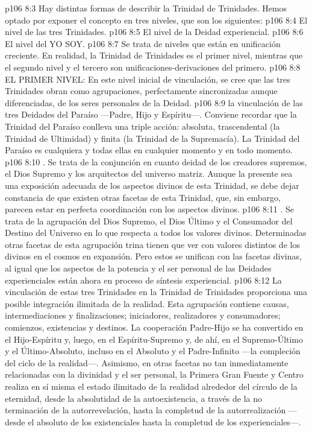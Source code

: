 \vs p106 8:3 Hay distintas formas de describir la Trinidad de Trinidades. Hemos optado por exponer el concepto en tres niveles, que son los siguientes:
\vs p106 8:4 El nivel de las tres Trinidades.
\vs p106 8:5 El nivel de la Deidad experiencial.
\vs p106 8:6 El nivel del YO SOY.
\vs p106 8:7 \pc Se trata de niveles que están en unificación creciente. En realidad, la Trinidad de Trinidades es el primer nivel, mientras que el segundo nivel y el tercero son unificaciones\hyp{}derivaciones del primero.
\vs p106 8:8 \pc EL PRIMER NIVEL: En este nivel inicial de vinculación, se cree que las tres Trinidades obran como agrupaciones, perfectamente sincronizadas aunque diferenciadas, de los seres personales de la Deidad.
\vs p106 8:9  la vinculación de las tres Deidades del Paraíso ---Padre, Hijo y Espíritu---. Conviene recordar que la Trinidad del Paraíso conlleva una triple acción: absoluta, trascendental (la Trinidad de Ultimidad) y finita (la Trinidad de la Supremacía). La Trinidad del Paraíso es cualquiera y todas ellas en cualquier momento y en todo momento.
\vs p106 8:10 . Se trata de la conjunción en cuanto deidad de los creadores supremos, el Dios Supremo y los arquitectos del universo matriz. Aunque la presente sea una exposición adecuada de los aspectos divinos de esta Trinidad, se debe dejar constancia de que existen otras facetas de esta Trinidad, que, sin embargo, parecen estar en perfecta coordinación con los aspectos divinos.
\vs p106 8:11 . Se trata de la agrupación del Dios Supremo, el Dios Último y el Consumador del Destino del Universo en lo que respecta a todos los valores divinos. Determinadas otras facetas de esta agrupación trina tienen que ver con valores distintos de los divinos en el cosmos en expansión. Pero estos se unifican con las facetas divinas, al igual que los aspectos de la potencia y el ser personal de las Deidades experienciales están ahora en proceso de síntesis experiencial.
\vs p106 8:12 \pc La vinculación de estas tres Trinidades en la Trinidad de Trinidades proporciona una posible integración ilimitada de la realidad. Esta agrupación contiene causas, intermediaciones y finalizaciones; iniciadores, realizadores y consumadores; comienzos, existencias y destinos. La cooperación Padre\hyp{}Hijo se ha convertido en el Hijo\hyp{}Espíritu y, luego, en el Espíritu\hyp{}Supremo y, de ahí, en el Supremo\hyp{}Último y el Último\hyp{}Absoluto, incluso en el Absoluto y el Padre\hyp{}Infinito ---la compleción del ciclo de la realidad---. Asimismo, en otras facetas no tan inmediatamente relacionadas con la divinidad y el ser personal, la Primera Gran Fuente y Centro realiza en sí misma el estado ilimitado de la realidad alrededor del círculo de la eternidad, desde la absolutidad de la autoexistencia, a través de la no terminación de la autorrevelación, hasta la completud de la autorrealización ---desde el absoluto de los existenciales hasta la completud de los experienciales---.

